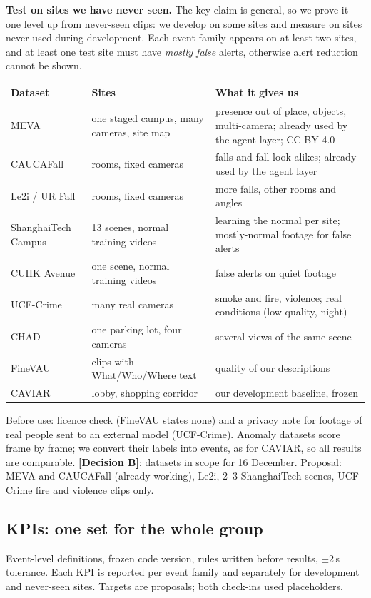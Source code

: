 \documentclass[11pt,a4paper]{article}
\newcommand{\decision}[1]{\textbf{\color{accent}[Decision #1]}}
\begin{document}
\textbf{Test on sites we have never seen.} The key claim is general, so we prove it one level up from
never-seen clips: we develop on some sites and measure on sites never used during development. Each event family
appears on at least two sites, and at least one test site must have \emph{mostly false} alerts, otherwise alert
reduction cannot be shown.

\begin{center}
\small
\begin{tabularx}{\textwidth}{L{2.6cm}L{4.0cm}Y}
\toprule
\textbf{Dataset} & \textbf{Sites} & \textbf{What it gives us}\\
\midrule
MEVA & one staged campus, many cameras, site map & presence out of place, objects, multi-camera; already used by the agent layer; CC-BY-4.0\\
CAUCAFall & rooms, fixed cameras & falls and fall look-alikes; already used by the agent layer\\
Le2i / UR Fall & rooms, fixed cameras & more falls, other rooms and angles\\
ShanghaiTech Campus & 13 scenes, normal training videos & learning the normal per site; mostly-normal footage for false alerts\\
CUHK Avenue & one scene, normal training videos & false alerts on quiet footage\\
UCF-Crime & many real cameras & smoke and fire, violence; real conditions (low quality, night)\\
CHAD & one parking lot, four cameras & several views of the same scene\\
FineVAU & clips with What/Who/Where text & quality of our descriptions\\
CAVIAR & lobby, shopping corridor & our development baseline, frozen\\
\bottomrule
\end{tabularx}
\end{center}

Before use: licence check (FineVAU states none) and a privacy note for footage of real people sent to an external
model (UCF-Crime). Anomaly datasets score frame by frame; we convert their labels into events, as for CAVIAR, so
all results are comparable. \decision{B}: datasets in scope for 16 December. Proposal: MEVA and CAUCAFall (already
working), Le2i, 2--3 ShanghaiTech scenes, UCF-Crime fire and violence clips only.

\subsection*{KPIs: one set for the whole group}
Event-level definitions, frozen code version, rules written before results, $\pm$2\,s tolerance. Each KPI is
reported per event family and separately for development and never-seen sites. Targets are proposals; both
check-ins used placeholders.
\end{document}
